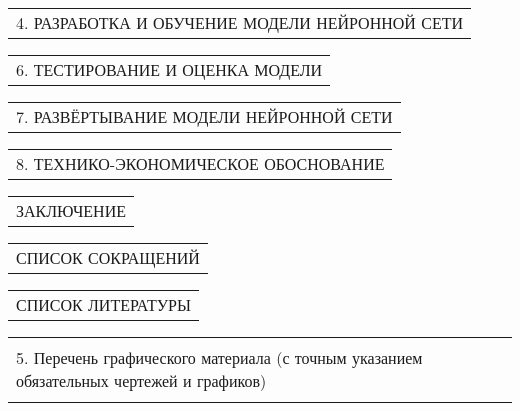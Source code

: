 \documentclass[12pt, А4, twoside]{article}
\begin{document}
\begin{FlushLeft}
    \begin{tabular}{p{17.25cm}} 
        \hspace{0.3cm} \textsf{4. РАЗРАБОТКА И ОБУЧЕНИЕ МОДЕЛИ НЕЙРОННОЙ СЕТИ} \vspace{1pt} \hline \\
    \end{tabular}  

    \begin{tabular}{p{17.25cm}} 
        \hspace{0.3cm} \textsf{6. ТЕСТИРОВАНИЕ И ОЦЕНКА МОДЕЛИ} \vspace{1pt} \hline \\
    \end{tabular} 

    \begin{tabular}{p{17.25cm}} 
        \hspace{0.3cm} \textsf{7. РАЗВЁРТЫВАНИЕ МОДЕЛИ НЕЙРОННОЙ СЕТИ} \vspace{1pt} \hline \\
    \end{tabular}  

    \begin{tabular}{p{17.25cm}} 
        \hspace{0.3cm} \textsf{8. ТЕХНИКО-ЭКОНОМИЧЕСКОЕ ОБОСНОВАНИЕ} \vspace{2pt} \hline \\
    \end{tabular}  

    \begin{tabular}{p{17.25cm}} 
        \textsf{ЗАКЛЮЧЕНИЕ} \vspace{2pt} \hline \\
    \end{tabular}  

    \begin{tabular}{p{17.25cm}} 
        \textsf{СПИСОК СОКРАЩЕНИЙ} \vspace{1pt} \hline \\
    \end{tabular}  

    \begin{tabular}{p{17.25cm}} 
        \textsf{СПИСОК ЛИТЕРАТУРЫ} \vspace{2pt} \hline  \\
    \end{tabular}  

    \begin{tabular}{p{17.25cm}} 
        \vspace{1pt} \hline  \\
        \textsf{5. Перечень графического материала (с точным указанием обязательных чертежей и графиков)} \vspace{1pt} \hline \\
        \vspace{1pt} \hline  \\
    \end{tabular} 


\end{FlushLeft}
\end{document}
